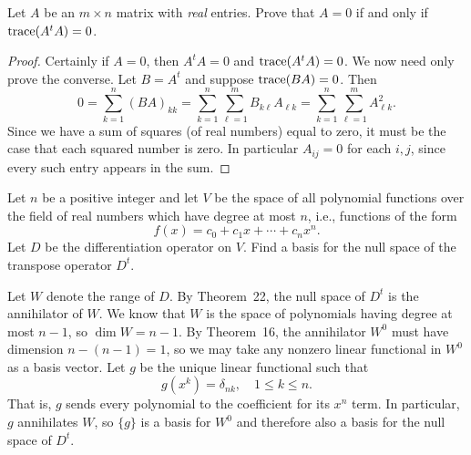  Let $A$ be an $m\times n$ matrix with {\em real}
entries. Prove that $A = 0$ if and only if $\operatorname{trace}(A^tA) = 0$.
\begin{proof}
  Certainly if $A = 0$, then $A^tA = 0$ and $\operatorname{trace}(A^tA) = 0$. We now
  need only prove the converse. Let $B = A^t$ and suppose
  $\operatorname{trace}(BA) = 0$. Then
  \begin{equation*}
    0
    = \sum_{k=1}^n(BA)_{kk}
    = \sum_{k=1}^n\sum_{\ell=1}^mB_{k\ell}A_{\ell k}
    = \sum_{k=1}^n\sum_{\ell=1}^mA_{\ell k}^2.
  \end{equation*}
  Since we have a sum of squares (of real numbers) equal to zero, it
  must be the case that each squared number is zero. In particular
  $A_{ij} = 0$ for each $i,j$, since every such entry appears in the
  sum.
\end{proof}

 Let $n$ be a positive integer and let $V$ be the space of
all polynomial functions over the field of real numbers which have
degree at most $n$, i.e., functions of the form
\begin{equation*}
  f(x) = c_0 + c_1x + \cdots + c_nx^n.
\end{equation*}
Let $D$ be the differentiation operator on $V$. Find a basis for the
null space of the transpose operator $D^t$.
\begin{solution}
  Let $W$ denote the range of $D$. By Theorem~22, the null space of
  $D^t$ is the annihilator of $W$. We know that $W$ is the space of
  polynomials having degree at most $n - 1$, so $\dim W = n - 1$. By
  Theorem~16, the annihilator $W^0$ must have dimension
  $n - (n - 1) = 1$, so we may take any nonzero linear functional in
  $W^0$ as a basis vector. Let $g$ be the unique linear functional
  such that
  \begin{equation*}
    g(x^k) = \delta_{nk}, \quad 1\leq k\leq n.
  \end{equation*}
  That is, $g$ sends every polynomial to the coefficient for its $x^n$
  term. In particular, $g$ annihilates $W$, so $\{g\}$ is a basis for
  $W^0$ and therefore also a basis for the null space of $D^t$.
\end{solution}
